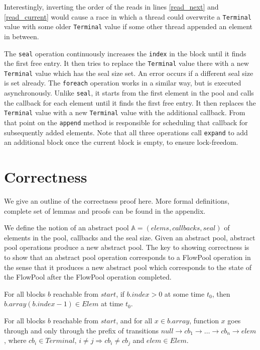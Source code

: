 \documentclass[runningheads,a4paper]{llncs}
\begin{document}
Interestingly, inverting the order of the reads in lines
\ref{read_next} and \ref{read_current} would cause a race in which a
thread could overwrite a \verb=Terminal= value with some older
\verb=Terminal= value if some other thread appended an element in between.

The \verb=seal= operation continuously increases the \verb=index= in the block
until it finds the first free entry. It then tries to replace the \verb=Terminal=
value there with a new \verb=Terminal= value which has the seal size set.
An error occurs if a different seal size is set already. The \verb=foreach=
operation works in a similar way, but is executed asynchronously. Unlike
\verb=seal=, it starts from the first element in the pool and calls the
callback for each element until it finds the first free entry.
It then replaces the \verb=Terminal= value with a new \verb=Terminal=
value with the additional callback. From that point on the \verb=append=
method is responsible for scheduling that callback for subsequently added elements.
Note that all three operations call \verb=expand= to add an additional
block once the current block is empty, to ensure lock-freedom.



\section{Correctness}

We give an outline of the correctness proof here. More formal
definitions, complete set of lemmas and proofs can be found in the
appendix.

We define the notion of an abstract pool $\mathbb{A} = (elems,
callbacks, seal)$ of elements in the pool, callbacks and the seal
size.
Given an abstract pool, abstract pool operations produce a new
abstract pool.
The key to showing correctness is to show that an abstract pool operation
corresponds to a FlowPool operation in the sense that it produces a
new abstract pool which corresponds to the state of the FlowPool after
the FlowPool operation completed.

\begin{lemma}
For all blocks $b$ reachable from $start$, if $b.index > 0$ at some time $t_0$, then
$b.array(b.index - 1) \in Elem$ at time $t_0$.
\end{lemma}

\begin{lemma}
For all blocks $b$ reachable from $start$, and for all $x \in b.array$,
function $x$ goes through and only through the prefix of transitions
$null \rightarrow cb_1 \rightarrow \dots \rightarrow cb_n \rightarrow elem$, where
$cb_i \in Terminal$, $i \neq j \Rightarrow cb_i \neq cb_j$ and $elem \in Elem$.
\end{lemma}
\end{document}
